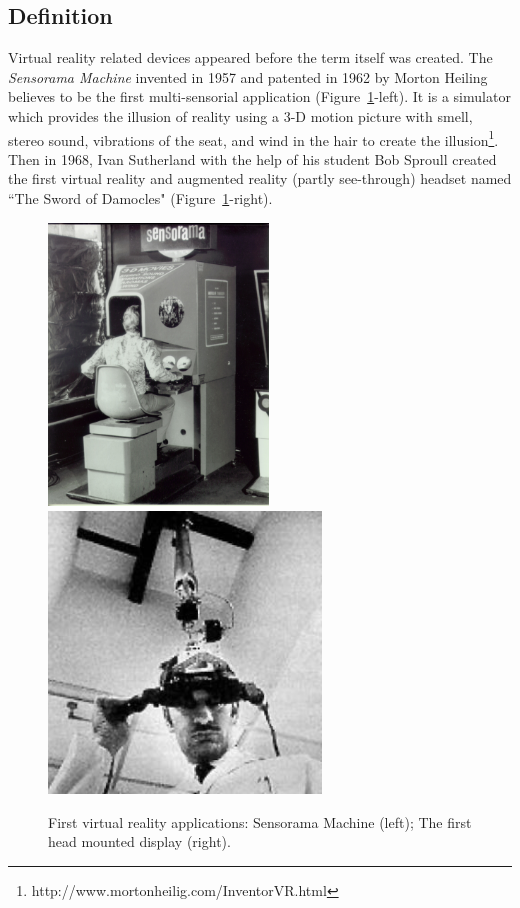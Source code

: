 \subsection{Definition}
Virtual reality related devices appeared before the term itself was created. The \textit{Sensorama Machine} invented in 1957 and patented in 1962 by Morton Heiling believes to be the first multi-sensorial application (Figure~\ref{fig:1_earlyapp}-left). It is a simulator which provides the illusion of reality using a 3-D motion picture with smell, stereo sound, vibrations of the seat, and wind in the hair to create the illusion\footnote{http://www.mortonheilig.com/InventorVR.html}. Then in 1968, Ivan Sutherland with the help of his student Bob Sproull created the first virtual reality and augmented reality (partly see-through) headset named ``The Sword of Damocles" \citep{Sutherland1968Hmd} (Figure~\ref{fig:1_earlyapp}-right).

\begin{figure}[htb]
  \centering
  \includegraphics[height=7.5cm]{figures/ch1/sensorama}
  \includegraphics[height=7.5cm]{figures/ch1/ultimateHMD}
  \caption{\label{fig:1_earlyapp}First virtual reality applications: Sensorama Machine (left); The first head mounted display (right).}
\end{figure}

